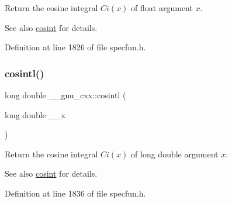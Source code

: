 Return the cosine integral $ Ci(x) $ of {\ttfamily float} argument $ x $.

\begin{DoxySeeAlso}{See also}
\hyperlink{group__gnu__math__spec__func_gafd398869cde057087e6b3428a1d13a93}{cosint} for details. 
\end{DoxySeeAlso}


Definition at line 1826 of file specfun.\+h.

\mbox{\label{group__gnu__math__spec__func_ga5f01f17ae8859129860118b09d51791c}} 
\subsubsection{\texorpdfstring{cosintl()}{cosintl()}}
{\footnotesize\ttfamily long double \+\_\+\+\_\+gnu\+\_\+cxx\+::cosintl (\begin{DoxyParamCaption}\item[{long double}]{\+\_\+\+\_\+x }\end{DoxyParamCaption})\hspace{0.3cm}{\ttfamily [inline]}}

Return the cosine integral $ Ci(x) $ of {\ttfamily long double} argument $ x $.

\begin{DoxySeeAlso}{See also}
\hyperlink{group__gnu__math__spec__func_gafd398869cde057087e6b3428a1d13a93}{cosint} for details. 
\end{DoxySeeAlso}


Definition at line 1836 of file specfun.\+h.

\mbox{\label{group__gnu__math__spec__func_ga5329bba77d10a9d2f15d9bbe43a70db3}} 
